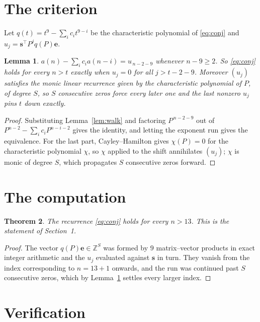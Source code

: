 \documentclass[11pt,a4paper]{article}
\theoremstyle{plain}
\newtheorem{theorem}{Theorem}
\newtheorem{lemma}[theorem]{Lemma}
\theoremstyle{definition}
\begin{document}
\section{The criterion}

Let $q(t)=t^{9}-\sum_i c_i t^{9-i}$ be the characteristic polynomial of
\eqref{eq:conj} and $u_j=\mathbf{s}^{\!\top}P^{j}q(P)\mathbf{e}$.

\begin{lemma}\label{lem:crit}
$a(n)-\sum_i c_i a(n-i)=u_{\,n-2-9}$ whenever $n-9\ge2$. So \eqref{eq:conj}
holds for every $n>t$ exactly when $u_j=0$ for all $j>t-2-9$. Moreover $(u_j)$
satisfies the monic linear recurrence given by the characteristic polynomial of $P$, of
degree $S$, so $S$ consecutive zeros force every later one and the last nonzero $u_j$ pins
$t$ down exactly.
\end{lemma}

\begin{proof}
Substituting Lemma~\ref{lem:walk} and factoring $P^{\,n-2-9}$ out of
$P^{n-2}-\sum_i c_i P^{n-i-2}$ gives the identity, and letting the exponent run gives the
equivalence. For the last part, Cayley--Hamilton gives $\chi(P)=0$ for the characteristic
polynomial $\chi$, so $\chi$ applied to the shift annihilates $(u_j)$; $\chi$ is monic of
degree $S$, which propagates $S$ consecutive zeros forward.
\end{proof}

\section{The computation}

\begin{theorem}
The recurrence \eqref{eq:conj} holds for every $n>13$. This is the statement of
Section~1.
\end{theorem}

\begin{proof}
The vector $q(P)\mathbf{e}\in\mathbb{Z}^{S}$ was formed by $9$ matrix--vector
products in exact integer arithmetic and the $u_j$ evaluated against $\mathbf{s}$ in turn.
They vanish from the index corresponding to $n=13+1$ onwards, and the run was continued
past $S$ consecutive zeros, which by Lemma~\ref{lem:crit} settles every larger index.
\end{proof}

\section{Verification}
\end{document}
